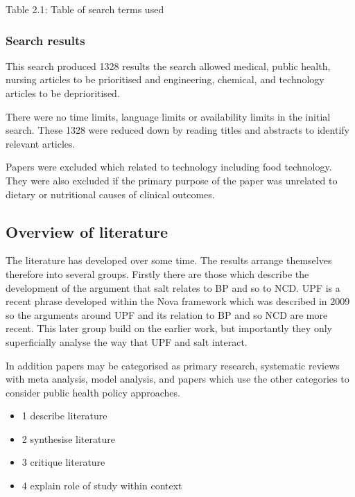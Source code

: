 \documentclass[
]{article}
\providecommand{\tightlist}{%
  \setlength{\itemsep}{0pt}\setlength{\parskip}{0pt}}
\begin{document}
Table 2.1: Table of search terms used

\hypertarget{search-results}{%
\subsubsection{Search results}\label{search-results}}

This search produced 1328 results the search allowed medical, public
health, nursing articles to be prioritised and engineering, chemical,
and technology articles to be deprioritised.

There were no time limits, language limits or availability limits in the
initial search. These 1328 were reduced down by reading titles and
abstracts to identify relevant articles.

Papers were excluded which related to technology including food
technology. They were also excluded if the primary purpose of the paper
was unrelated to dietary or nutritional causes of clinical outcomes.

\hypertarget{overview-of-literature}{%
\subsection{Overview of literature}\label{overview-of-literature}}

The literature has developed over some time. The results arrange
themselves therefore into several groups. Firstly there are those which
describe the development of the argument that salt relates to BP and so
to NCD. UPF is a recent phrase developed within the Nova framework which
was described in 2009 so the arguments around UPF and its relation to BP
and so NCD are more recent. This later group build on the earlier work,
but importantly they only superficially analyse the way that UPF and
salt interact.

In addition papers may be categorised as primary research, systematic
reviews with meta analysis, model analysis, and papers which use the
other categories to consider public health policy approaches.

\begin{itemize}
\tightlist
\item
  1 describe literature
\item
  2 synthesise literature
\item
  3 critique literature
\item
  4 explain role of study within context
\end{itemize}
\end{document}

